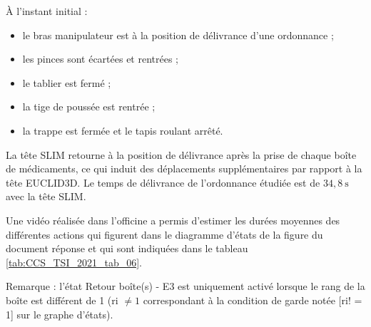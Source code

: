 À l'instant initial :

\begin{itemize}
  \item le bras manipulateur est à la position de délivrance d'une ordonnance ;

  \item les pinces sont écartées et rentrées ;

  \item le tablier est fermé ;

  \item la tige de poussée est rentrée ;

  \item la trappe est fermée et le tapis roulant arrêté.

\end{itemize}

La tête SLIM retourne à la position de délivrance après la prise de chaque boîte de médicaments, ce qui induit des déplacements supplémentaires par rapport à la tête EUCLID3D. Le temps de délivrance de l'ordonnance étudiée est de $34,8 \mathrm{~s}$ avec la tête SLIM.

Une vidéo réalisée dans l'officine a permis d'estimer les durées moyennes des différentes actions qui figurent dans le diagramme d'états de la figure \label{fig:CCS_TSI_2021_fig_D} du document réponse et qui sont indiquées dans le tableau \ref{tab:CCS_TSI_2021_tab_06}.

Remarque : l'état Retour boîte(s) - E3 est uniquement activé lorsque le rang de la boîte est différent de 1 (ri $\neq 1$ correspondant à la condition de garde notée [ri! = 1] sur le graphe d'états).




